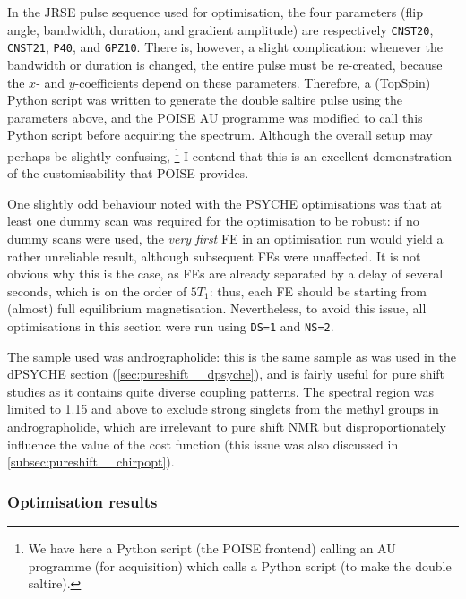 In the JRSE pulse sequence used for optimisation, the four parameters (flip angle, bandwidth, duration, and gradient amplitude) are respectively \texttt{CNST20}, \texttt{CNST21}, \texttt{P40}, and \texttt{GPZ10}.
There is, however, a slight complication: whenever the bandwidth or duration is changed, the entire pulse must be re-created, because the $x$- and $y$-coefficients depend on these parameters.
Therefore, a (TopSpin) Python script was written to generate the double saltire pulse using the parameters above, and the POISE AU programme was modified to call this Python script before acquiring the spectrum.
Although the overall setup may perhaps be slightly confusing,%
\footnote{We have here a Python script (the POISE frontend) calling an AU programme (for acquisition) which calls a Python script (to make the double saltire).}
I contend that this is an excellent demonstration of the customisability that POISE provides.

One slightly odd behaviour noted with the PSYCHE optimisations was that at least one dummy scan was required for the optimisation to be robust:
if no dummy scans were used, the \textit{very first} FE in an optimisation run would yield a rather unreliable result, although subsequent FEs were unaffected.
It is not obvious why this is the case, as FEs are already separated by a delay of several seconds, which is on the order of $5T_1$: thus, each FE should be starting from (almost) full equilibrium magnetisation.
Nevertheless, to avoid this issue, all optimisations in this section were run using \texttt{DS=1} and \texttt{NS=2}.

The sample used was andrographolide: this is the same sample as was used in the dPSYCHE section (\cref{sec:pureshift__dpsyche}), and is fairly useful for pure shift studies as it contains quite diverse coupling patterns.
The spectral region was limited to \qty{1.15}{\ppm} and above to exclude strong singlets from the methyl groups in andrographolide, which are irrelevant to pure shift NMR but disproportionately influence the value of the cost function (this issue was also discussed in \cref{subsec:pureshift__chirpopt}).


\subsubsection{Optimisation results}

